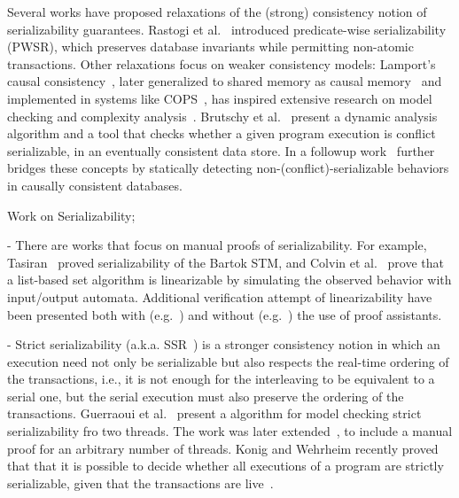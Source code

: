 Several works have proposed relaxations of the (strong) consistency notion of serializability guarantees. Rastogi et al.~\cite{RaMeBrKoSi93} introduced predicate-wise serializability (PWSR), which preserves database invariants while permitting non-atomic transactions. 
%
Other relaxations focus on weaker consistency models: Lamport’s causal consistency~\cite{La78}, later generalized to shared memory as causal memory~\cite{AhNeBuKoHu95} and implemented in systems like COPS~\cite{LlFrKaAn11}, has inspired extensive research on model checking and complexity analysis~\cite{BoEnGuHa17,ZeBiBoEnEr19,LaBo20}. 
%
Brutschy et al.~\cite{BrDiMuVe17} present a dynamic analysis algorithm and a tool that checks whether a given program execution is conflict serializable, in an eventually consistent data store. In a followup work~\cite{BrDiMuVe18} further bridges these concepts by statically detecting non-(conflict)-serializable behaviors in causally consistent databases.
%



Work on Serializability;

- There are works that focus on manual proofs of serializability. For example, Tasiran~\cite{Ta08} proved serializability of the Bartok STM, and Colvin et al.~\cite{CoGrLuMo06} prove that a list-based set algorithm is linearizable by simulating the observed behavior with input/output automata.
Additional verification attempt of linearizability have been presented both with (e.g.~\cite{CoGrLuMo06}) and without (e.g.~\cite{DoGrLuMo04}) the use of proof assistants.

- Strict serializability (a.k.a. SSR~\cite{Pa79}) is a stronger consistency notion in which an execution need not only be serializable but also respects the real-time ordering of the transactions, i.e., it is not enough for the interleaving to be equivalent to a serial one, but the serial execution must also preserve the ordering of the transactions.
%
Guerraoui et al.~\cite{GuHeJoSi08} present a algorithm for model checking strict serializability fro two threads. The work was later extended~\cite{GuHeSi11}, to include a manual proof for an arbitrary number of threads.
%
Konig and Wehrheim recently proved that that it is possible to decide whether all executions of a program are strictly serializable, given that the transactions are live~\cite{KoWe21}.


